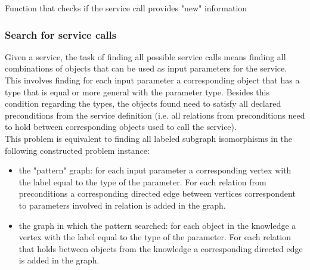 \documentclass[12pt]{article}
\theoremstyle{definition}
\begin{document}
	\begin{algorithm}[H]
		\caption{Function that checks if the service call provides "new" information}
	\end{algorithm}

	\subsubsection{Search for service calls}
	Given a service, the task of finding all possible service calls means finding all combinations of objects that can be used as input parameters for the service. This involves finding for each input parameter a corresponding object that has a type that is equal or more general with the parameter type. Besides this condition regarding the types, the objects found need to satisfy all declared preconditions from the service definition (i.e. all relations from preconditions need to hold between corresponding objects used to call the service). \\
	This problem is equivalent to finding all labeled subgraph isomorphisms in the following constructed problem instance: 
	\begin{itemize}
		\item the "pattern" graph: for each input parameter a corresponding vertex with the label equal to the type of the parameter. For each relation from preconditions a corresponding directed edge between vertices correspondent to parameters involved in relation is added in the graph.
		\item the graph in which the pattern searched: for each object in the knowledge a vertex with the label equal to the type of the parameter. For each relation that holds between objects from the knowledge a corresponding directed edge is added in the graph.
	\end{itemize}
\end{document}
